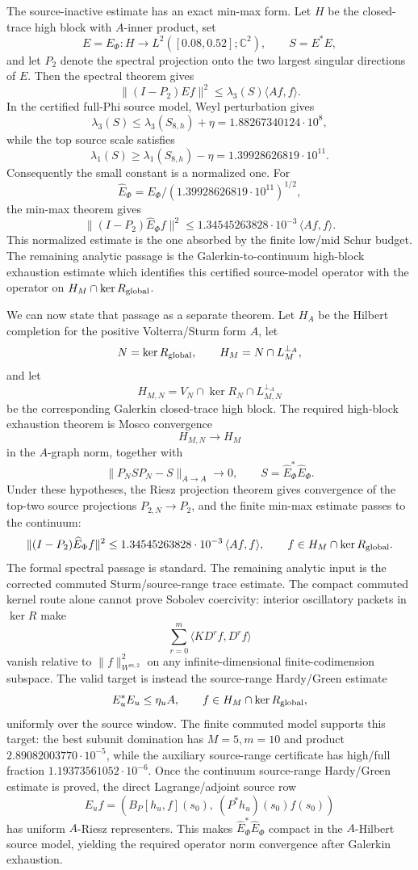 \documentclass[11pt]{article}
\begin{document}
The source-inactive estimate has an exact min-max form.  Let \(H\) be the
closed-trace high block with \(A\)-inner product, set
\[
  E=E_\Phi:H\to L^2([0.08,0.52];\mathbb C^2),
  \qquad S=E^\ast E,
\]
and let \(P_2\) denote the spectral projection onto the two largest singular
directions of \(E\).  Then the spectral theorem gives
\[
  \|(I-P_2)E f\|^2\le \lambda_3(S)\langle Af,f\rangle .
\]
In the certified full-Phi source model, Weyl perturbation gives
\[
  \lambda_3(S)\le
  \lambda_3(S_{8,h})+\eta
  =1.88267340124\cdot10^8,
\]
while the top source scale satisfies
\[
  \lambda_1(S)\ge
  \lambda_1(S_{8,h})-\eta
  =1.39928626819\cdot10^{11}.
\]
Consequently the small constant is a normalized one.  For
\[
  \widehat E_\Phi
  =
  E_\Phi/(1.39928626819\cdot10^{11})^{1/2},
\]
the min-max theorem gives
\[
  \|(I-P_2)\widehat E_\Phi f\|^2
  \le
  1.34545263828\cdot10^{-3}\,\langle Af,f\rangle .
\]
This normalized estimate is the one absorbed by the finite low/mid Schur
budget.  The remaining analytic passage is the Galerkin-to-continuum high-block
exhaustion estimate which identifies this certified source-model operator with
the operator on \(H_M\cap\ker R_{\rm global}\).

We can now state that passage as a separate theorem.  Let \(H_A\) be the
Hilbert completion for the positive Volterra/Sturm form \(A\), let
\[
  N=\ker R_{\rm global},\qquad
  H_M=N\cap L_M^{\perp_A},
\]
and let
\[
  H_{M,N}=V_N\cap\ker R_N\cap L_{M,N}^{\perp_A}
\]
be the corresponding Galerkin closed-trace high block.  The required
high-block exhaustion theorem is Mosco convergence
\[
  H_{M,N}\longrightarrow H_M
\]
in the \(A\)-graph norm, together with
\[
  \|P_NS P_N-S\|_{A\to A}\to0,\qquad
  S=\widehat E_\Phi^\ast\widehat E_\Phi .
\]
Under these hypotheses, the Riesz projection theorem gives convergence of the
top-two source projections \(P_{2,N}\to P_2\), and the finite min-max estimate
passes to the continuum:
\[
  \|(I-P_2)\widehat E_\Phi f\|^2
  \le
  1.34545263828\cdot10^{-3}\,\langle Af,f\rangle ,
  \qquad f\in H_M\cap\ker R_{\rm global}.
\]
The formal spectral passage is standard.  The remaining analytic input is the
corrected commuted Sturm/source-range trace estimate.  The compact commuted
kernel route alone cannot prove Sobolev coercivity: interior oscillatory
packets in \(\ker R\) make
\[
  \sum_{r=0}^m\langle K D^r f,D^r f\rangle
\]
vanish relative to \(\|f\|_{W^{m,2}}^2\) on any infinite-dimensional
finite-codimension subspace.  The valid target is instead the source-range
Hardy/Green estimate
\[
  E_u^\ast E_u\le \eta_u A,\qquad
  f\in H_M\cap\ker R_{\rm global},
\]
uniformly over the source window.  The finite commuted model supports this
target: the best subunit domination has \(M=5,m=10\) and product
\(2.89082003770\cdot10^{-5}\), while the auxiliary source-range certificate has
high/full fraction \(1.19373561052\cdot10^{-6}\).  Once the continuum
source-range Hardy/Green estimate is proved, the direct Lagrange/adjoint source
row
\[
  E_u f=
  \left(B_P[h_u,f](s_0),\ (P^\ast h_u)(s_0)f(s_0)\right)
\]
has uniform \(A\)-Riesz representers.  This makes
\(\widehat E_\Phi^\ast\widehat E_\Phi\) compact in the \(A\)-Hilbert source
model, yielding the required operator norm convergence after Galerkin
exhaustion.
\end{document}
